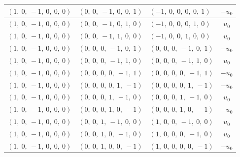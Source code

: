 \documentclass[11pt]{article}
\theoremstyle{definition}
\begin{document}
\begin{longtable}{|l|l|l|c|}
    \hline
    $\left( 1, \  0, \  -1, \  0, \  0, \  0\right)$ & $\left( 0, \  0, \  -1, \  0, \  0, \  1\right)$ & $\left( -1, \  0, \  0, \  0, \  0, \  1\right)$ & $- u_{0}$ \\
    \hline
    $\left( 1, \  0, \  -1, \  0, \  0, \  0\right)$ & $\left( 0, \  0, \  -1, \  0, \  1, \  0\right)$ & $\left( -1, \  0, \  0, \  0, \  1, \  0\right)$ & $u_{0}$ \\
    \hline
    $\left( 1, \  0, \  -1, \  0, \  0, \  0\right)$ & $\left( 0, \  0, \  -1, \  1, \  0, \  0\right)$ & $\left( -1, \  0, \  0, \  1, \  0, \  0\right)$ & $u_{0}$ \\
    \hline
    $\left( 1, \  0, \  -1, \  0, \  0, \  0\right)$ & $\left( 0, \  0, \  0, \  -1, \  0, \  1\right)$ & $\left( 0, \  0, \  0, \  -1, \  0, \  1\right)$ & $- u_{0}$ \\
    \hline
    $\left( 1, \  0, \  -1, \  0, \  0, \  0\right)$ & $\left( 0, \  0, \  0, \  -1, \  1, \  0\right)$ & $\left( 0, \  0, \  0, \  -1, \  1, \  0\right)$ & $u_{0}$ \\
    \hline
    $\left( 1, \  0, \  -1, \  0, \  0, \  0\right)$ & $\left( 0, \  0, \  0, \  0, \  -1, \  1\right)$ & $\left( 0, \  0, \  0, \  0, \  -1, \  1\right)$ & $- u_{0}$ \\
    \hline
    $\left( 1, \  0, \  -1, \  0, \  0, \  0\right)$ & $\left( 0, \  0, \  0, \  0, \  1, \  -1\right)$ & $\left( 0, \  0, \  0, \  0, \  1, \  -1\right)$ & $- u_{0}$ \\
    \hline
    $\left( 1, \  0, \  -1, \  0, \  0, \  0\right)$ & $\left( 0, \  0, \  0, \  1, \  -1, \  0\right)$ & $\left( 0, \  0, \  0, \  1, \  -1, \  0\right)$ & $u_{0}$ \\
    \hline
    $\left( 1, \  0, \  -1, \  0, \  0, \  0\right)$ & $\left( 0, \  0, \  0, \  1, \  0, \  -1\right)$ & $\left( 0, \  0, \  0, \  1, \  0, \  -1\right)$ & $- u_{0}$ \\
    \hline
    $\left( 1, \  0, \  -1, \  0, \  0, \  0\right)$ & $\left( 0, \  0, \  1, \  -1, \  0, \  0\right)$ & $\left( 1, \  0, \  0, \  -1, \  0, \  0\right)$ & $u_{0}$ \\
    \hline
    $\left( 1, \  0, \  -1, \  0, \  0, \  0\right)$ & $\left( 0, \  0, \  1, \  0, \  -1, \  0\right)$ & $\left( 1, \  0, \  0, \  0, \  -1, \  0\right)$ & $u_{0}$ \\
    \hline
    $\left( 1, \  0, \  -1, \  0, \  0, \  0\right)$ & $\left( 0, \  0, \  1, \  0, \  0, \  -1\right)$ & $\left( 1, \  0, \  0, \  0, \  0, \  -1\right)$ & $- u_{0}$ \\

\end{longtable}
\end{document}

